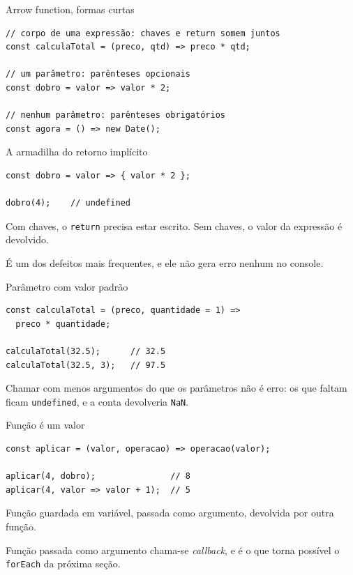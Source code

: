 \documentclass{beamer}
\begin{document}
\begin{frame}[fragile]{Arrow function, formas curtas}
	\begin{verbatim}
// corpo de uma expressão: chaves e return somem juntos
const calculaTotal = (preco, qtd) => preco * qtd;

// um parâmetro: parênteses opcionais
const dobro = valor => valor * 2;

// nenhum parâmetro: parênteses obrigatórios
const agora = () => new Date();
	\end{verbatim}
\end{frame}

\begin{frame}[fragile]{A armadilha do retorno implícito}
	\begin{verbatim}
const dobro = valor => { valor * 2 };

dobro(4);    // undefined
	\end{verbatim}

	\vspace{0.3cm}
	Com chaves, o \texttt{return} precisa estar escrito. Sem chaves, o valor da
	expressão é devolvido.

	\vspace{0.3cm}
	É um dos defeitos mais frequentes, e ele não gera erro nenhum no console.
\end{frame}

\begin{frame}[fragile]{Parâmetro com valor padrão}
	\begin{verbatim}
const calculaTotal = (preco, quantidade = 1) =>
  preco * quantidade;

calculaTotal(32.5);      // 32.5
calculaTotal(32.5, 3);   // 97.5
	\end{verbatim}

	\vspace{0.2cm}
	Chamar com menos argumentos do que os parâmetros não é erro: os que faltam
	ficam \texttt{undefined}, e a conta devolveria \texttt{NaN}.
\end{frame}

\begin{frame}[fragile]{Função é um valor}
	\begin{verbatim}
const aplicar = (valor, operacao) => operacao(valor);

aplicar(4, dobro);               // 8
aplicar(4, valor => valor + 1);  // 5
	\end{verbatim}

	\vspace{0.3cm}
	Função guardada em variável, passada como argumento, devolvida por outra
	função.

	\vspace{0.3cm}
	Função passada como argumento chama-se \emph{callback}, e é o que torna
	possível o \texttt{forEach} da próxima seção.
\end{frame}
\end{document}
